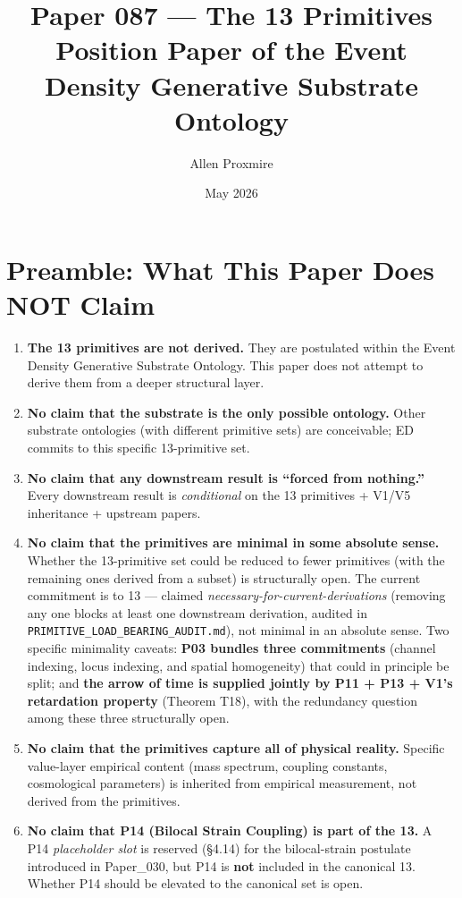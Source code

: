\documentclass[11pt,a4paper]{article}
\title{\vspace{-1cm}\Large\bfseries Paper 087 --- The 13 Primitives\\[6pt]
\large\mdseries Position Paper of the Event Density Generative Substrate Ontology}
\author{Allen Proxmire}
\date{May 2026}
\begin{document}
\maketitle

\section*{Preamble: What This Paper Does NOT Claim}

\begin{enumerate}[noitemsep]
\item \textbf{The 13 primitives are not derived.} They are postulated within the Event Density Generative Substrate Ontology. This paper does not attempt to derive them from a deeper structural layer.
\item \textbf{No claim that the substrate is the only possible ontology.} Other substrate ontologies (with different primitive sets) are conceivable; ED commits to this specific 13-primitive set.
\item \textbf{No claim that any downstream result is ``forced from nothing.''} Every downstream result is \emph{conditional} on the 13 primitives + V1/V5 inheritance + upstream papers.
\item \textbf{No claim that the primitives are minimal in some absolute sense.} Whether the 13-primitive set could be reduced to fewer primitives (with the remaining ones derived from a subset) is structurally open. The current commitment is to 13 --- claimed \emph{necessary-for-current-derivations} (removing any one blocks at least one downstream derivation, audited in \texttt{PRIMITIVE\_LOAD\_BEARING\_AUDIT.md}), not minimal in an absolute sense. Two specific minimality caveats: \textbf{P03 bundles three commitments} (channel indexing, locus indexing, and spatial homogeneity) that could in principle be split; and \textbf{the arrow of time is supplied jointly by P11 + P13 + V1's retardation property} (Theorem T18), with the redundancy question among these three structurally open.
\item \textbf{No claim that the primitives capture all of physical reality.} Specific value-layer empirical content (mass spectrum, coupling constants, cosmological parameters) is inherited from empirical measurement, not derived from the primitives.
\item \textbf{No claim that P14 (Bilocal Strain Coupling) is part of the 13.} A P14 \emph{placeholder slot} is reserved (\S4.14) for the bilocal-strain postulate introduced in Paper\_030, but P14 is \textbf{not} included in the canonical 13. Whether P14 should be elevated to the canonical set is open.

\end{enumerate}
\end{document}
